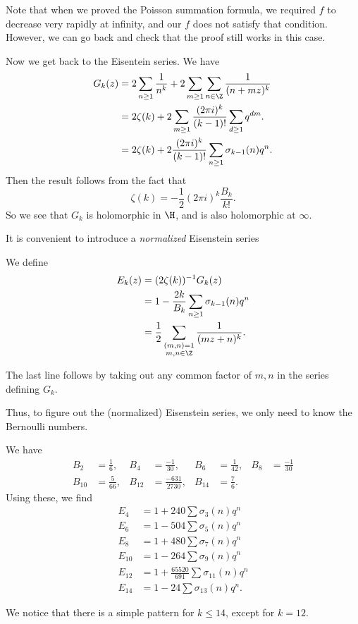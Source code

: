 \documentclass[a4paper]{article}
\begin{document}
Note that when we proved the Poisson summation formula, we required $f$ to decrease very rapidly at infinity, and our $f$ does not satisfy that condition. However, we can go back and check that the proof still works in this case.

Now we get back to the Eisentein series. We have
\begin{align*}
  G_k(z) &= 2 \sum_{n \geq 1} \frac{1}{n^k} + 2 \sum_{m \geq 1} \sum_{n \in \Z} \frac{1}{(n + mz)^k}\\
  &= 2 \zeta(k) + 2 \sum_{m \geq 1} \frac{(2\pi i )^k}{(k - 1)!} \sum_{d \geq 1} q^{dm}.\\
  &= 2 \zeta(k) + 2 \frac{(2\pi i)^k}{(k - 1)!} \sum_{n \geq 1} \sigma_{k - 1}(n) q^n.
\end{align*}
Then the result follows from the fact that
\[
  \zeta(k) = -\frac{1}{2} (2\pi i)^k \frac{B_k}{k!}.
\]
So we see that $G_k$ is holomorphic in $\H$, and is also holomorphic at $\infty$.

It is convenient to introduce a \emph{normalized} Eisenstein series
\begin{defi}
  We define
  \begin{align*}
    E_k(z) &= (2 \zeta(k))^{-1} G_k(z) \\
    &= 1 - \frac{2k}{B_k} \sum_{n \geq 1} \sigma_{k - 1}(n) q^n\\
    &= \frac{1}{2} \sum_{\substack{(m, n) = 1\\m , n \in \Z}} \frac{1}{(mz + n)^k}.
  \end{align*}
\end{defi}
The last line follows by taking out any common factor of $m, n$ in the series defining $G_k$.

Thus, to figure out the (normalized) Eisenstein series, we only need to know the Bernoulli numbers.
\begin{eg}
  We have
  \begin{align*}
    B_2 &= \frac{1}{6}, & B_4 &= \frac{-1}{30}, & B_6 &= \frac{1}{42}, & B_8 &= \frac{-1}{30}\\
    B_{10} &= \frac{5}{66}, & B_{12} &= \frac{-631}{2730}, & B_{14} &= \frac{7}{6}.
  \end{align*}
  Using these, we find
  \begin{align*}
    E_4 &= 1 + 240 \sum \sigma_3(n) q^n\\
    E_6 &= 1 - 504 \sum \sigma_5 (n) q^n\\
    E_8 &= 1 + 480 \sum \sigma_7(n) q^n\\
    E_{10} &= 1 - 264 \sum \sigma_9(n) q^n\\
    E_{12} &= 1 + \frac{65520}{691} \sum \sigma_{11}(n) q^n\\
    E_{14} &= 1 - 24 \sum \sigma_{13}(n) q^n.
  \end{align*}
\end{eg}
We notice that there is a simple pattern for $k \leq 14$, except for $k = 12$.
\end{document}
